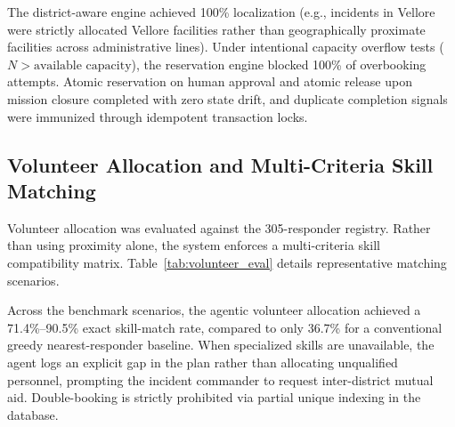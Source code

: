 \documentclass[conference]{IEEEtran}
\begin{document}
The district-aware engine achieved 100\% localization (e.g., incidents in Vellore were strictly allocated Vellore facilities rather than geographically proximate facilities across administrative lines). Under intentional capacity overflow tests ($N > \text{available capacity}$), the reservation engine blocked 100\% of overbooking attempts. Atomic reservation on human approval and atomic release upon mission closure completed with zero state drift, and duplicate completion signals were immunized through idempotent transaction locks.

\subsection{Volunteer Allocation and Multi-Criteria Skill Matching}
Volunteer allocation was evaluated against the 305-responder registry. Rather than using proximity alone, the system enforces a multi-criteria skill compatibility matrix. Table~\ref{tab:volunteer_eval} details representative matching scenarios.

\begin{table}[htbp]
\caption{Volunteer Allocation and Skill Matching Matrix Evaluation.}
\label{tab:volunteer_eval}
\centering
{}
\end{table}

Across the benchmark scenarios, the agentic volunteer allocation achieved a 71.4\%--90.5\% exact skill-match rate, compared to only 36.7\% for a conventional greedy nearest-responder baseline. When specialized skills are unavailable, the agent logs an explicit gap in the plan rather than allocating unqualified personnel, prompting the incident commander to request inter-district mutual aid. Double-booking is strictly prohibited via partial unique indexing in the database.
\end{document}
